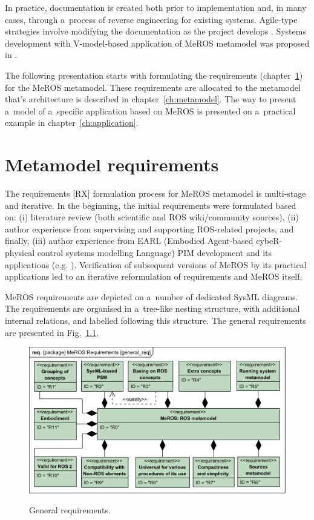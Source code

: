 \documentclass[11pt,oneside,a4paper]{report}
\begin{document}
	In practice, documentation is created both prior to implementation and, in many cases, through a~process of reverse  engineering \cite{canfora2007new} for existing systems. Agile-type strategies involve modifying the documentation as the project develops \cite{habib2021systematic}. Systems development with V-model-based application of MeROS metamodel was proposed in \cite{winiarski2025-v-model}.
			
	The following presentation starts with formulating the requirements (chapter~\ref{ch:requirements}) for the MeROS metamodel. These requirements are allocated to the metamodel that's architecture is described in chapter~\ref{ch:metamodel}. The way to present a~model of a~specific application based on MeROS is presented on a~practical example in chapter~\ref{ch:application}.
	
	
\chapter{Metamodel requirements}
\label{ch:requirements}
	The requirements [RX] formulation process for MeROS metamodel is multi-stage and iterative. In the beginning, the initial requirements were formulated based on: (i) literature review (both scientific and ROS wiki/community sources), (ii) author experience from supervising and supporting ROS-related projects, and finally, (iii) author experience from EARL (Embodied Agent-based cybeR-physical control systems modelling Language) \cite{earl2020} PIM development and its applications (e.g. \cite{tasker2020,karwowski2021hubero,en14206693-grav-comp}). Verification of subsequent versions of MeROS by its practical applications led to an iterative reformulation of requirements and MeROS itself. 
	
	MeROS requirements are depicted on a~number of dedicated SysML diagrams. The requirements are organised in a~tree-like nesting structure, with additional internal relations, and labelled following this structure. The general requirements are presented in Fig.~\ref{fig:general_req}. 
		
	\begin{figure}[H]
		\centering
		\begin{center}
			{\includegraphics[scale=1.0]{diagrams/general_req.png}}
		\end{center}
		\caption{General requirements.} 
		\label{fig:general_req}
	\end{figure}
		
\end{document}
